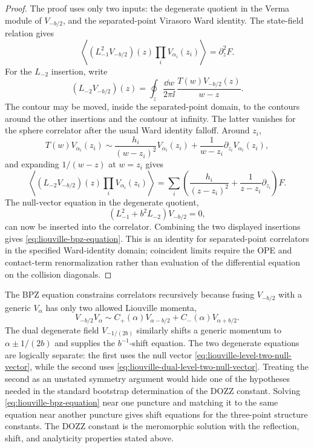 \begin{proof}
The proof uses only two inputs: the degenerate quotient in the Verma module of
\(V_{-b/2}\), and the separated-point Virasoro Ward identity.  The
state-field relation gives
\[
  \left\langle
    (L_{-1}^2V_{-b/2})(z)\prod_iV_{\alpha_i}(z_i)
  \right\rangle
  =
  \partial_z^2 F .
\]
For the \(L_{-2}\) insertion, write
\[
  (L_{-2}V_{-b/2})(z)
  =
  \oint_z\frac{\dd w}{2\pi\ii}\,
  \frac{T(w)V_{-b/2}(z)}{w-z}.
\]
The contour may be moved, inside the separated-point domain, to the contours
around the other insertions and the contour at infinity.  The latter vanishes
for the sphere correlator after the usual Ward identity falloff.  Around
\(z_i\),
\[
  T(w)V_{\alpha_i}(z_i)
  \sim
  \frac{h_i}{(w-z_i)^2}V_{\alpha_i}(z_i)
  +
  \frac{1}{w-z_i}\partial_{z_i}V_{\alpha_i}(z_i),
\]
and expanding \(1/(w-z)\) at \(w=z_i\) gives
\[
  \left\langle
    (L_{-2}V_{-b/2})(z)\prod_iV_{\alpha_i}(z_i)
  \right\rangle
  =
  \sum_i
  \left(
    \frac{h_i}{(z-z_i)^2}
      +\frac1{z-z_i}\partial_{z_i}
    \right)F.
\]
The null-vector equation in the degenerate quotient,
\[
  (L_{-1}^2+b^2L_{-2})V_{-b/2}=0,
\]
can now be inserted into the correlator.  Combining the two displayed
insertions gives \eqref{eq:liouville-bpz-equation}.  This is an identity for
separated-point correlators in the specified Ward-identity domain; coincident
limits require the OPE and contact-term renormalization rather than evaluation
of the differential equation on the collision diagonals.
\end{proof}

The BPZ equation constrains correlators recursively because fusing
\(V_{-b/2}\) with a generic \(V_\alpha\) has only two allowed Liouville
momenta,
\[
  V_{-b/2}V_\alpha
  \sim
  C_+(\alpha)V_{\alpha-b/2}
  +
  C_-(\alpha)V_{\alpha+b/2}.
\]
The dual degenerate field \(V_{-1/(2b)}\) similarly shifts a generic momentum
to \(\alpha\pm1/(2b)\) and supplies the \(b^{-1}\)-shift equation.  The two
degenerate equations are logically separate: the first uses the null vector
\eqref{eq:liouville-level-two-null-vector}, while the second uses
\eqref{eq:liouville-dual-level-two-null-vector}.  Treating the second as an
unstated symmetry argument would hide one of the hypotheses needed in the
standard bootstrap determination of the DOZZ constant.
Solving \eqref{eq:liouville-bpz-equation} near one puncture and matching it
to the same equation near another puncture gives shift equations for the
three-point structure constants.  The DOZZ constant is the meromorphic
solution with the reflection, shift, and analyticity properties stated above.

